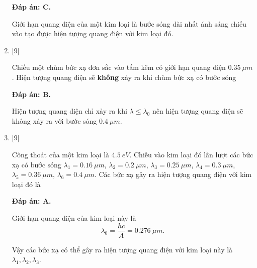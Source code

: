 \begin{enumerate}[label=\bfseries Câu \arabic*:]
	\loigiai
	{		\textbf{Đáp án: C.}
		
		Giới hạn quang điện của một kim loại là bước sóng dài nhất ánh sáng chiếu vào tạo được hiện tượng quang điện với kim loại đó.
	}
	
	\item {} [9]
	\cauhoi
	{Chiếu một chùm bức xạ đơn sắc vào tấm kẽm có giới hạn quang điện $\SI{0,35}{\mu m}$. Hiện tượng quang điện sẽ \textbf{không} xảy ra khi chùm bức xạ có bước sóng
	}
	
	\loigiai
	{		\textbf{Đáp án: B.}
		
		Hiện tượng quang điện chỉ xảy ra khi $\lambda \leq \lambda_{0}$ nên hiện tượng quang điện sẽ không xảy ra với bước sóng $\SI{0,4}{\mu m}$. 
	}
	
	\item {} [9]
	\cauhoi
	{Công thoát của một kim loại là $\SI{4,5}{eV}$. Chiếu vào kim loại đó lần lượt các bức xạ có bước sóng $\lambda_{1} = \SI{0,16}{\mu m}$, $\lambda_{2} = \SI{0,2}{\mu m}$, $\lambda_{3} = \SI{0,25}{\mu m}$, $\lambda_{4} = \SI{0,3}{\mu m}$, $\lambda_{5} = \SI{0,36}{\mu m}$, $\lambda_6 = \SI{0,4}{\mu m}$. Các bức xạ gây ra hiện tượng quang điện với kim loại đó là
	}
	
	\loigiai
	{		\textbf{Đáp án: A.}
		
		Giới hạn quang điện của kim loại này là
		$$
		\lambda_{0} = \dfrac{hc}{A} = \SI{0,276}{\mu m}.
		$$
		
		Vậy các bức xạ có thể gây ra hiện tượng quang điện với kim loại này là $\lambda_{1}, \lambda_{2}, \lambda_{3}$. 
	}
	
\end{enumerate}

